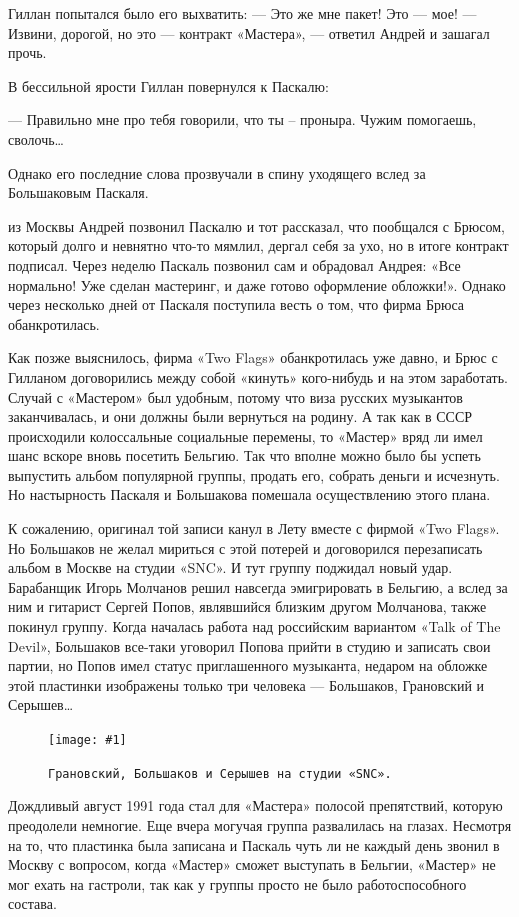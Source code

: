 \documentclass[10pt, twoside]{book}
\newcommand{\myincludegraphics}[1]{\texttt{[image: \#1]}}
\begin{document}
Гиллан попытался было его выхватить:
— Это же мне пакет! Это — мое!
— Извини, дорогой, но это — контракт «Мастера», — ответил Андрей и зашагал прочь.

В бессильной ярости Гиллан повернулся к Паскалю:

— Правильно мне про тебя говорили, что ты – проныра. Чужим помогаешь, сволочь\ldots

Однако его последние слова прозвучали в спину уходящего вслед за Большаковым Паскаля.

 из Москвы Андрей позвонил Паскалю и тот рассказал, что пообщался с Брюсом, который долго и невнятно что-то
мямлил, дергал себя за ухо, но в итоге контракт подписал. Через неделю Паскаль позвонил сам и обрадовал Андрея: «Все
нормально! Уже сделан мастеринг, и даже готово оформление обложки!». Однако через несколько дней от Паскаля поступила
весть о том, что фирма Брюса обанкротилась.

Как позже выяснилось, фирма «Two Flags» обанкротилась уже давно, и Брюс с Гилланом договорились между собой «кинуть»
кого-нибудь и на этом заработать. Случай с «Мастером» был удобным, потому что виза русских музыкантов заканчивалась, и
они должны были вернуться на родину. А так как в СССР происходили колоссальные социальные перемены, то «Мастер» вряд ли
имел шанс вскоре вновь посетить Бельгию. Так что вполне можно было бы успеть выпустить альбом популярной группы, продать
его, собрать деньги и исчезнуть. Но настырность Паскаля и Большакова помешала осуществлению этого плана.

К сожалению, оригинал той записи канул в Лету вместе с фирмой «Two Flags». Но Большаков не желал мириться с этой потерей
и договорился перезаписать альбом в Москве на студии «SNC». И тут группу поджидал новый удар. Барабанщик Игорь Молчанов
решил навсегда эмигрировать в Бельгию, а вслед за ним и гитарист Сергей Попов, являвшийся близким другом Молчанова,
также покинул группу. Когда началась работа над российским вариантом «Talk of The Devil», Большаков все-таки уговорил
Попова прийти в студию и записать свои партии, но Попов имел статус приглашенного музыканта, недаром на обложке этой
пластинки изображены только три человека — Большаков, Грановский и Серышев\ldots

\begin{figure}[h]
    \centering
    \myincludegraphics{Image27}
    \caption{\texttt{Грановский, Большаков и Серышев на студии «SNC».}}
\end{figure}

Дождливый август 1991 года стал для «Мастера» полосой препятствий, которую преодолели немногие. Еще вчера могучая группа
развалилась на глазах. Несмотря на то, что пластинка была записана и Паскаль чуть ли не каждый день звонил в Москву с
вопросом, когда «Мастер» сможет выступать в Бельгии, «Мастер» не мог ехать на гастроли, так как у группы просто не было
работоспособного состава.
\end{document}
